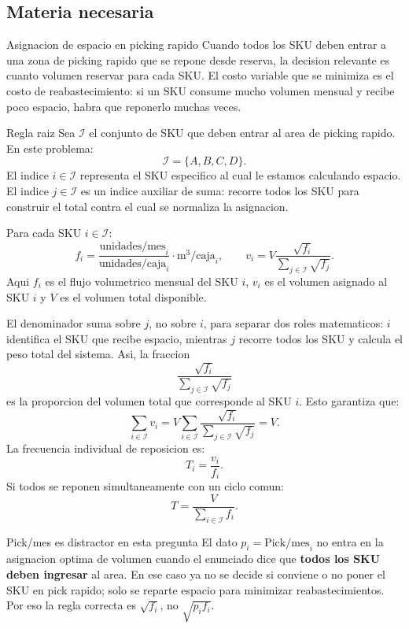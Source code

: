 \subsection{Materia necesaria}

\begin{definicion}{Asignacion de espacio en picking rapido}
Cuando todos los SKU deben entrar a una zona de picking rapido que se repone desde reserva, la decision relevante es cuanto volumen reservar para cada SKU. El costo variable que se minimiza es el costo de reabastecimiento: si un SKU consume mucho volumen mensual y recibe poco espacio, habra que reponerlo muchas veces.
\end{definicion}

\begin{formulas}{Regla raiz}
Sea \(\mathcal{I}\) el conjunto de SKU que deben entrar al area de picking rapido. En este problema:
\[
\mathcal{I}=\{A,B,C,D\}.
\]
El indice \(i\in\mathcal{I}\) representa el SKU especifico al cual le estamos calculando espacio. El indice \(j\in\mathcal{I}\) es un indice auxiliar de suma: recorre todos los SKU para construir el total contra el cual se normaliza la asignacion.

Para cada SKU \(i\in\mathcal{I}\):
\[
f_i=\frac{\text{unidades/mes}_i}{\text{unidades/caja}_i}\cdot \text{m}^3/\text{caja}_i,
\qquad
v_i=V\frac{\sqrt{f_i}}{\sum_{j\in\mathcal{I}} \sqrt{f_j}}.
\]
Aqui \(f_i\) es el flujo volumetrico mensual del SKU \(i\), \(v_i\) es el volumen asignado al SKU \(i\) y \(V\) es el volumen total disponible.

El denominador suma sobre \(j\), no sobre \(i\), para separar dos roles matematicos: \(i\) identifica el SKU que recibe espacio, mientras \(j\) recorre todos los SKU y calcula el peso total del sistema. Asi, la fraccion
\[
\frac{\sqrt{f_i}}{\sum_{j\in\mathcal{I}}\sqrt{f_j}}
\]
es la proporcion del volumen total que corresponde al SKU \(i\). Esto garantiza que:
\[
\sum_{i\in\mathcal{I}} v_i
=
V\sum_{i\in\mathcal{I}}
\frac{\sqrt{f_i}}{\sum_{j\in\mathcal{I}}\sqrt{f_j}}
=V.
\]
La frecuencia individual de reposicion es:
\[
T_i=\frac{v_i}{f_i}.
\]
Si todos se reponen simultaneamente con un ciclo comun:
\[
T=\frac{V}{\sum_{i\in\mathcal{I}} f_i}.
\]
\end{formulas}

\begin{trampa}{Pick/mes es distractor en esta pregunta}
El dato \(p_i=\text{Pick/mes}_i\) no entra en la asignacion optima de volumen cuando el enunciado dice que \textbf{todos los SKU deben ingresar} al area. En ese caso ya no se decide si conviene o no poner el SKU en pick rapido; solo se reparte espacio para minimizar reabastecimientos. Por eso la regla correcta es \(\sqrt{f_i}\), no \(\sqrt{p_i f_i}\).
\end{trampa}

